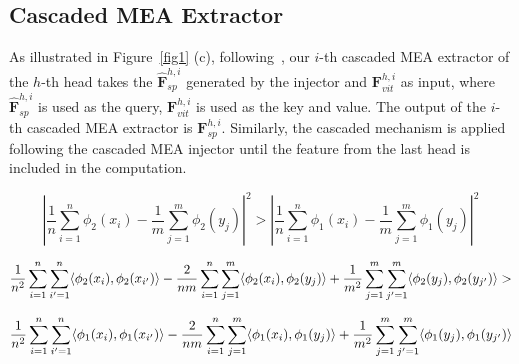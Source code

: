 \subsection{Cascaded MEA Extractor}
\label{sec:3:4}
As illustrated in Figure~\ref{fig1} (c), following~\citep{marouf2024mini,chen2022adaptformer,dong2024efficient},
our $i$-th cascaded MEA extractor of the $h$-th head takes the $\hat{\textbf{F}}^{h,i}_{sp}$ generated by the injector and $\textbf{F}^{h,i}_{vit}$ as input, where $\hat{\textbf{F}}^{h,i}_{sp}$ is used as the query, $\textbf{F}^{h,i}_{vit}$ is used as the key and value. The output of the $i$-th cascaded MEA extractor is $\textbf{F}^{h,i}_{sp}$. Similarly, the cascaded mechanism is applied following the cascaded MEA injector until the feature from the last head is included in the computation.
\iffalse
\begin{small} 
\begin{equation*} 
\left| \frac{1}{n}\sum_{i=1}^{n}\phi_2(x_i) - \frac{1}{m}\sum_{j=1}^{m}\phi_2(y_j) \right|^2 > \left| \frac{1}{n}\sum_{i=1}^{n}\phi_1(x_i) - \frac{1}{m}\sum_{j=1}^{m}\phi_1(y_j) \right|^2 
\end{equation*}
\end{small}

\begin{small} 
\begin{equation*} 
\small
\frac{1}{n^2}\sum_{i=1}^{n}\sum_{i'=1}^{n}\langle\phi_2(x_i),\phi_2(x_{i'})\rangle - \frac{2}{nm}\sum_{i=1}^{n}\sum_{j=1}^{m}\langle\phi_2(x_i),\phi_2(y_j)\rangle + \frac{1}{m^2}\sum_{j=1}^{m}\sum_{j'=1}^{m}\langle\phi_2(y_j),\phi_2(y_{j'})\rangle > 
\end{equation*} 
\end{small}
\begin{small} 
\begin{equation*}
\frac{1}{n^2}\sum_{i=1}^{n}\sum_{i'=1}^{n}\langle\phi_1(x_i),\phi_1(x_{i'})\rangle - \frac{2}{nm}\sum_{i=1}^{n}\sum_{j=1}^{m}\langle\phi_1(x_i),\phi_1(y_j)\rangle + \\
\frac{1}{m^2}\sum_{j=1}^{m}\sum_{j'=1}^{m}\langle\phi_1(y_j),\phi_1(y_{j'})\rangle 
\end{equation*} 
\end{small}

